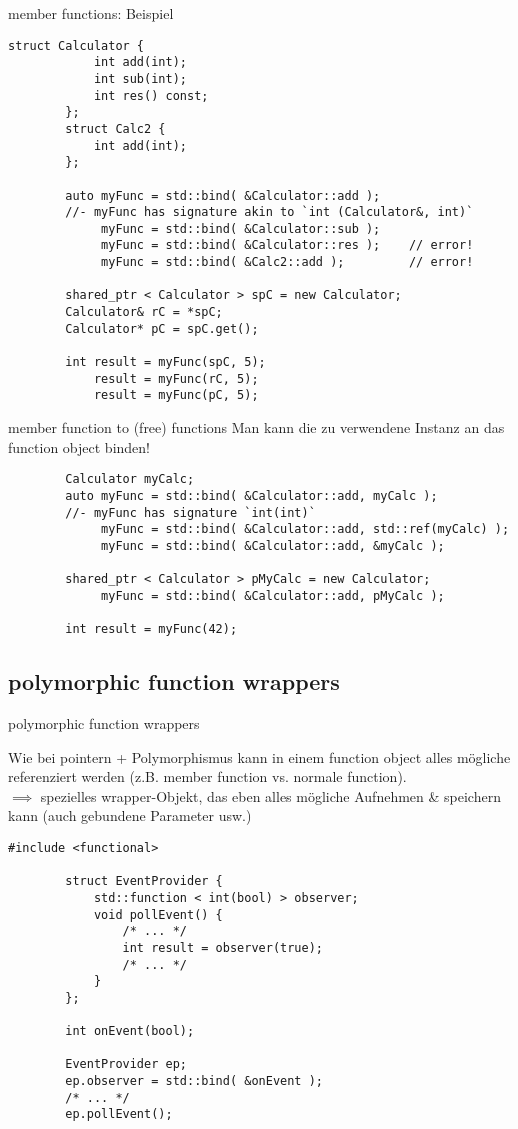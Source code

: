 \begin{frame}[fragile]{ member functions: Beispiel }
	\begin{lstlisting}[basicstyle=\scriptsize]
		struct Calculator {
		    int add(int);
		    int sub(int);
		    int res() const;
		};
		struct Calc2 {
		    int add(int);
		};
		
		auto myFunc = std::bind( &Calculator::add );
		//- myFunc has signature akin to `int (Calculator&, int)`
		     myFunc = std::bind( &Calculator::sub );
		     myFunc = std::bind( &Calculator::res );    // error!
		     myFunc = std::bind( &Calc2::add );         // error!
		
		shared_ptr < Calculator > spC = new Calculator;
		Calculator& rC = *spC;
		Calculator* pC = spC.get();
		
		int result = myFunc(spC, 5);
		    result = myFunc(rC, 5);
		    result = myFunc(pC, 5);
	\end{lstlisting}
\end{frame}

\begin{frame}[fragile]{ member function to (free) functions }
	Man kann die zu verwendene Instanz an das function object binden!
	
	\begin{lstlisting}
		Calculator myCalc;
		auto myFunc = std::bind( &Calculator::add, myCalc );
		//- myFunc has signature `int(int)`
		     myFunc = std::bind( &Calculator::add, std::ref(myCalc) );
		     myFunc = std::bind( &Calculator::add, &myCalc );
			 
		shared_ptr < Calculator > pMyCalc = new Calculator;
		     myFunc = std::bind( &Calculator::add, pMyCalc );
			 
		int result = myFunc(42);
	\end{lstlisting}
\end{frame}


\subsection{ polymorphic function wrappers }

\begin{frame}[fragile]{ polymorphic function wrappers }
	\footnotesize
	
	Wie bei pointern + Polymorphismus kann in einem function object alles mögliche referenziert werden (z.B. member function vs. normale function).	\\
	$\implies$ spezielles wrapper-Objekt, das eben alles mögliche Aufnehmen \& speichern kann (auch gebundene Parameter usw.)
	
	\pause
	
	\begin{lstlisting}[basicstyle=\scriptsize]
		#include <functional>
		
		struct EventProvider {
		    std::function < int(bool) > observer;
		    void pollEvent() {
		        /* ... */
		        int result = observer(true);
		        /* ... */
		    }
		};
		
		int onEvent(bool);
		
		EventProvider ep;
		ep.observer = std::bind( &onEvent );
		/* ... */
		ep.pollEvent();
	\end{lstlisting}
\end{frame}
